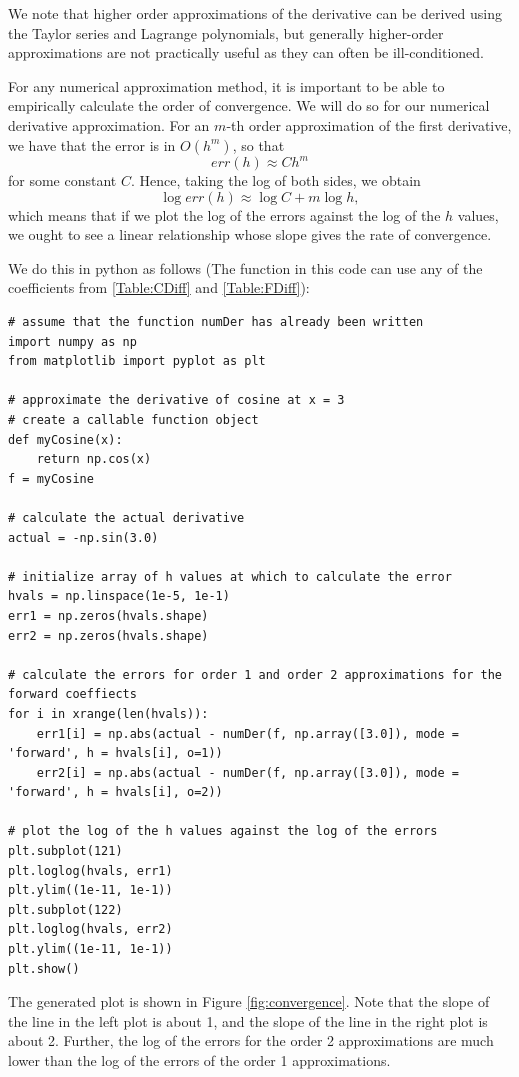 We note that higher order approximations of the derivative can be derived using the Taylor series and Lagrange polynomials, but generally higher-order approximations are not practically useful as they can often be ill-conditioned.

For any numerical approximation method, it is important to be able to empirically calculate
the order of convergence. We will do so for our numerical derivative approximation. 
For an $m$-th order approximation of the first derivative, we have that the error is in
$O(h^m)$, so that
$$
err(h) \approx Ch^m
$$
for some constant $C$.
Hence, taking the log of both sides, we obtain
$$
\log err(h) \approx \log C + m\log h,
$$
which means that if we plot the log of the errors against the log of the $h$ values, we 
ought to see a linear relationship whose slope gives the rate of convergence. 

We do this in python as follows (The  function in this code can use any of the coefficients from \ref{Table:CDiff} and \ref{Table:FDiff}):
\begin{lstlisting}
# assume that the function numDer has already been written
import numpy as np
from matplotlib import pyplot as plt

# approximate the derivative of cosine at x = 3
# create a callable function object
def myCosine(x):
    return np.cos(x)
f = myCosine

# calculate the actual derivative
actual = -np.sin(3.0)

# initialize array of h values at which to calculate the error
hvals = np.linspace(1e-5, 1e-1)
err1 = np.zeros(hvals.shape)
err2 = np.zeros(hvals.shape)

# calculate the errors for order 1 and order 2 approximations for the forward coeffiects
for i in xrange(len(hvals)):
    err1[i] = np.abs(actual - numDer(f, np.array([3.0]), mode = 'forward', h = hvals[i], o=1))
    err2[i] = np.abs(actual - numDer(f, np.array([3.0]), mode = 'forward', h = hvals[i], o=2))

# plot the log of the h values against the log of the errors
plt.subplot(121)
plt.loglog(hvals, err1)
plt.ylim((1e-11, 1e-1))
plt.subplot(122)
plt.loglog(hvals, err2)
plt.ylim((1e-11, 1e-1))
plt.show()
\end{lstlisting}

The generated plot is shown in Figure \ref{fig:convergence}. Note that the slope
of the line in the left plot is about 1, and the slope of the line in the right
plot is about 2. Further, the log of the errors for the order 2 approximations
are much lower than the log of the errors of the order 1 approximations.

